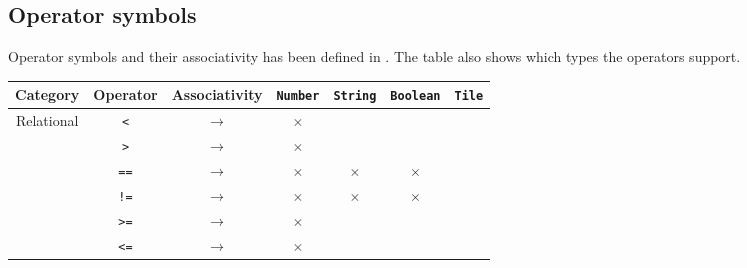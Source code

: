 \subsection{Operator symbols}
Operator symbols and their associativity has been defined in . The table also shows which types the operators support.

\begin{table}[h!]
    \centering
    \begin{tabular}{ |c|c|c||c|c|c|c| }
        \hline
        \textbf{Category} & \textbf{Operator} & \textbf{Associativity} & \texttt{Number} & \texttt{String} & \texttt{Boolean} & \texttt{Tile} \\
        \hline

        \multirow{6}{*}{Relational}
                          & \texttt{<}
                          & $\rightarrow$
                          & $\times$
                          &
                          &
                          &
        \\


                          & \texttt{>}
                          & $\rightarrow$
                          & $\times$
                          &
                          &
                          &
        \\


                          & \texttt{==}
                          & $\rightarrow$
                          & $\times$
                          & $\times$
                          & $\times$
                          &
        \\


                          & \texttt{!=}
                          & $\rightarrow$
                          & $\times$
                          & $\times$
                          & $\times$
                          &
        \\


                          & \texttt{>=}
                          & $\rightarrow$
                          & $\times$
                          &
                          &
                          &
        \\


                          & \texttt{<=}
                          & $\rightarrow$
                          & $\times$
                          &
                          &
                          &
        \\\hline


\end{tabular}
\end{table}
